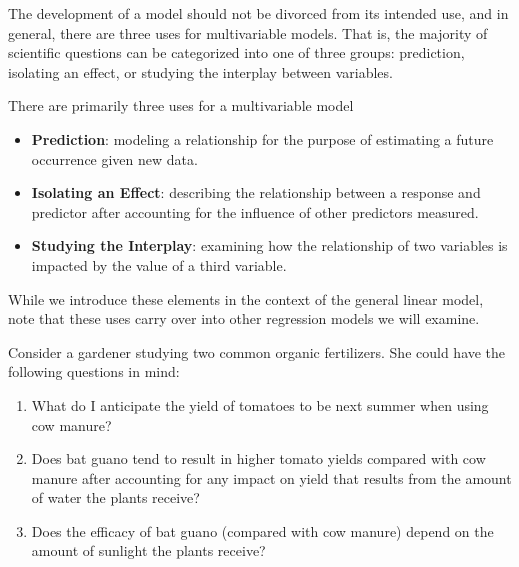 \documentclass[
  letterpaper,
  DIV=11,
  numbers=noendperiod]{scrreprt}
\providecommand{\tightlist}{%
  \setlength{\itemsep}{0pt}\setlength{\parskip}{0pt}}\usepackage{longtable,booktabs,array}
\theoremstyle{definition}
\theoremstyle{definition}
\theoremstyle{remark}
\begin{document}
The development of a model should not be divorced from its intended use,
and in general, there are three uses for multivariable models. That is,
the majority of scientific questions can be categorized into one of
three groups: prediction, isolating an effect, or studying the interplay
between variables.

\begin{tcolorbox}[enhanced jigsaw, left=2mm, toprule=.15mm, arc=.35mm, breakable, opacitybacktitle=0.6, opacityback=0, rightrule=.15mm, colbacktitle=quarto-callout-tip-color!10!white, coltitle=black, leftrule=.75mm, toptitle=1mm, colframe=quarto-callout-tip-color-frame, titlerule=0mm, title=\textcolor{quarto-callout-tip-color}{\faLightbulb}\hspace{0.5em}{Big Idea}, bottomrule=.15mm, colback=white, bottomtitle=1mm]

There are primarily three uses for a multivariable model

\begin{itemize}
\tightlist
\item
  \textbf{Prediction}: modeling a relationship for the purpose of
  estimating a future occurrence given new data.
\item
  \textbf{Isolating an Effect}: describing the relationship between a
  response and predictor after accounting for the influence of other
  predictors measured.
\item
  \textbf{Studying the Interplay}: examining how the relationship of two
  variables is impacted by the value of a third variable.
\end{itemize}

\end{tcolorbox}

While we introduce these elements in the context of the general linear
model, note that these uses carry over into other regression models we
will examine.

Consider a gardener studying two common organic fertilizers. She could
have the following questions in mind:

\begin{enumerate}
\def\labelenumi{\Alph{enumi}.}
\tightlist
\item
  What do I anticipate the yield of tomatoes to be next summer when
  using cow manure?
\item
  Does bat guano tend to result in higher tomato yields compared with
  cow manure after accounting for any impact on yield that results from
  the amount of water the plants receive?
\item
  Does the efficacy of bat guano (compared with cow manure) depend on
  the amount of sunlight the plants receive?
\end{enumerate}
\end{document}
